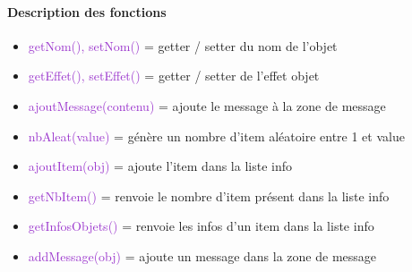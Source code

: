 \documentclass[12pt,a4paper]{report}
\begin{document}
			\paragraph{Description des fonctions}
			\begin{itemize}
				\item \textcolor{DarkOrchid}{getNom(), setNom()} = getter / setter du nom de l'objet
				\item \textcolor{DarkOrchid}{getEffet(), setEffet()} = getter / setter de l'effet objet
				\item \textcolor{DarkOrchid}{ajoutMessage(contenu)} = ajoute le message à la zone de message
				\item \textcolor{DarkOrchid}{nbAleat(value)} = génère un nombre d'item aléatoire entre 1 et value 
				\item \textcolor{DarkOrchid}{ajoutItem(obj)} = ajoute l'item dans la liste info
				\item \textcolor{DarkOrchid}{getNbItem()} = renvoie le nombre d'item présent dans la liste info
				\item \textcolor{DarkOrchid}{getInfosObjets()} = renvoie les infos d'un item dans la liste info
				\item \textcolor{DarkOrchid}{addMessage(obj)} = ajoute un message dans la zone de message
			\end{itemize}
\end{document}
